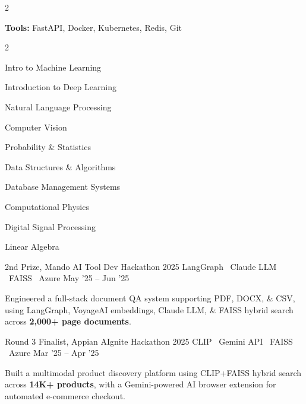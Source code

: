 \documentclass{resume}
\begin{document}
\begin{paracol}{2}
\begin{resumeItemize}
\item \textbf{Tools:}
FastAPI, Docker, Kubernetes, Redis, Git

\end{resumeItemize}


\setlength{\multicolsep}{0pt}
\begin{multicols}{2}
\begin{resumeItemize}
\item Intro to Machine Learning
\item Introduction to Deep Learning
\item Natural Language Processing
\item Computer Vision
\item Probability \& Statistics
\item Data Structures \& Algorithms
\item Database Management Systems
\item Computational Physics
\item Digital Signal Processing
\item Linear Algebra
\end{resumeItemize}
\end{multicols}


\resumeProject
{2nd Prize, Mando AI Tool Dev Hackathon 2025}
{LangGraph \textbar\ Claude LLM \textbar\ FAISS \textbar\ Azure}
{May '25 -- Jun '25}
{
\begin{resumeItemize}
\item Engineered a full-stack document QA system supporting PDF, DOCX, \& CSV, using LangGraph, VoyageAI embeddings, Claude LLM, \& FAISS hybrid search across \textbf{2,000+ page documents}.
\end{resumeItemize}
}
{\href{https://github.com/hemanthdatta}{\faGithub}}

\resumeDivider

\resumeProject
{Round 3 Finalist, Appian AIgnite Hackathon 2025}
{CLIP \textbar\ Gemini API \textbar\ FAISS \textbar\ Azure}
{Mar '25 -- Apr '25}
{
\begin{resumeItemize}
\item Built a multimodal product discovery platform using CLIP+FAISS hybrid search across \textbf{14K+ products}, with a Gemini-powered AI browser extension for automated e-commerce checkout.
\end{resumeItemize}
}
{\href{https://github.com/NikhilSwaroop-P/ByteStorm-Appian/tree/hemanth}{\faGithub}}


\end{paracol}
\end{document}
